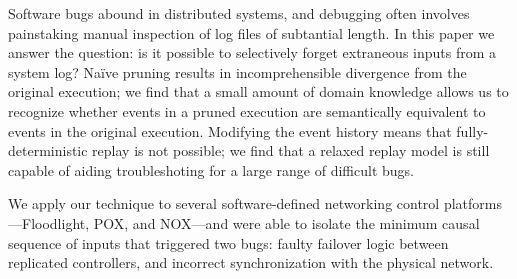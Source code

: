 Software bugs abound in distributed systems, and debugging
often involves painstaking manual inspection of log files of subtantial
length. In this paper we answer the question: is it possible to
selectively forget extraneous inputs from a system log? Na\"ive pruning
results in incomprehensible divergence from the original execution; we find
that a small amount of domain knowledge allows us to recognize whether events in
a pruned execution are semantically equivalent to events in the original
execution. Modifying the event history means that fully-deterministic replay is
not possible; we find that a relaxed replay model is still capable of
aiding troubleshoting for a large range of difficult bugs.

We apply our technique to several software-defined networking control
platforms---Floodlight, POX, and NOX---and
were able to isolate the minimum causal sequence of inputs that triggered
two bugs: faulty failover logic between replicated controllers, and incorrect
synchronization with the physical network.
